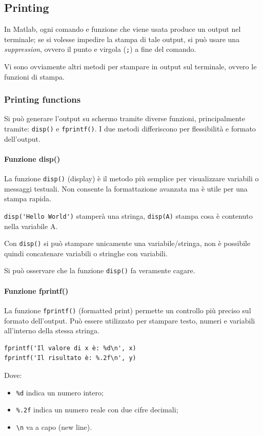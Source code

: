 \subsection{Printing}
In Matlab, ogni comando e funzione che viene usata produce un output nel terminale; se si volesse impedire la stampa di tale output, si può usare una \emph{suppression}, ovvero il punto e virgola (\verb|;|) a fine del comando.

Vi sono ovviamente altri metodi per stampare in output sul terminale, ovvero le funzioni di stampa.

\subsubsection{Printing functions}
Si può generare l'output su schermo tramite diverse funzioni, principalmente tramite: \verb|disp()| e \verb|fprintf()|.
I due metodi differiscono per flessibilità e formato dell'output.
\paragraph{Funzione disp()}
La funzione \verb|disp()| (display) è il metodo più semplice per visualizzare variabili o
messaggi testuali. Non consente la formattazione avanzata ma è utile per una stampa rapida.

\verb|disp('Hello World')| stamperà una stringa, \verb|disp(A)| stampa cosa è contenuto nella variabile A.

Con \verb|disp()| si può stampare unicamente una variabile/stringa, non è possibile quindi concatenare variabili
o stringhe con variabili.

\begin{note}
    Si può osservare che la funzione \verb|disp()| fa veramente cagare.
\end{note}

\paragraph{Funzione fprintf()}
La funzione \verb|fprintf()| (formatted print) permette un controllo più preciso sul formato dell'output.
Può essere utilizzato per stampare testo, numeri e variabili all'interno della stessa stringa.
\begin{verbatim}
fprintf('Il valore di x è: %d\n', x)
fprintf('Il risultato è: %.2f\n', y)
\end{verbatim}
Dove:
\begin{itemize}
    \item \texttt{\%d} indica un numero intero;
    \item \texttt{\%.2f} indica un numero reale con due cifre decimali;
    \item \texttt{\textbackslash n} va a capo (new line).
\end{itemize}

